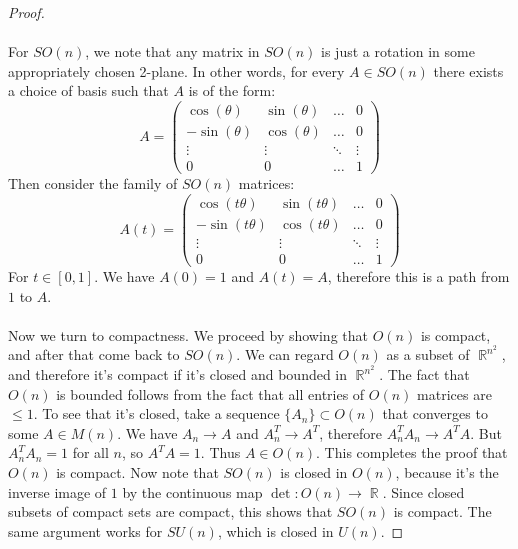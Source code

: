 \documentclass[12 pt]{article}
\DeclareMathOperator {\R} {\mathbb{R}}
\begin{document}
\begin{proof}
\\
\\
For $SO(n)$, we note that any matrix in $SO(n)$ is just a rotation in some appropriately chosen 2-plane. In other words, for every $A\in SO(n)$ there exists a choice of basis such that $A$ is of the form:
\[          A = \left(  \begin{array} {cccc}   \cos(\theta) & \sin(\theta) & \dots & 0 \\ - \sin(\theta) & \cos(\theta) & \dots & 0 \\ \vdots & \vdots&\ddots &\vdots \\  0&0 &\dots & 1  \end{array} \right)       \]
Then consider the family of $SO(n)$ matrices:
\[      A(t) =   \left(  \begin{array} {cccc}   \cos(t \theta) & \sin(t \theta) & \dots & 0 \\ - \sin(t \theta) & \cos(t \theta) & \dots & 0 \\ \vdots & \vdots&\ddots &\vdots \\  0&0 &\dots & 1  \end{array} \right)     \]
For $t\in[0,1]$. We have $A(0) = 1$ and $A(t) = A$, therefore this is a path from $1$ to $A$.
\\
\\
Now we turn to compactness. We proceed by showing that $O(n)$ is compact, and after that come back to $SO(n)$. We can regard $O(n)$ as a subset of $\R^{n^2}$, and therefore it's compact if it's closed and bounded in $\R^{n^2}$. The fact that $O(n)$ is bounded follows from the fact that all entries of $O(n)$ matrices are $\leq 1$. To see that it's closed, take a sequence $\{A_n\} \subset O(n)$ that converges to some $A \in M(n)$. We have $A_n \to A$ and $A_n^T \to A^T$, therefore $A_n^T A_n \to A^T A$. But $A_n^T A_n = 1$ for all $n$, so $A^T A = 1$. Thus $A \in O(n)$. This completes the proof that $O(n)$ is compact. Now note that $SO(n)$ is closed in $O(n)$, because it's the inverse image of $1$ by the continuous map $\det : O(n) \to \R$. Since closed subsets of compact sets are compact, this shows that $SO(n)$ is compact. The same argument works for $SU(n)$, which is closed in $U(n)$.
\end{proof}
\end{document}
